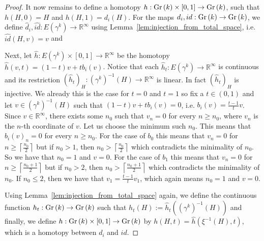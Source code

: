 \begin{proof}
It now remains to define a homotopy $h:\Gr{k}\times[0,1]\to\Gr{k}$, such that $h(H,0)=H$ and $h(H,1)=d_i(H)$. For the maps $d_i,id:\Gr{k}\to\Gr{k}$, we define $\hat{d}_i,\hat{id}:E(\gamma^k)\to \mathbb{R}^{\infty}$ using Lemma~\ref{lem:injection_from_total_space}, i.e. $\hat{id}(H,v)=v$ and
\begin{center}
\end{center}
Next, let $\hat{h}:E(\gamma^k)\times[0,1]\to\mathbb{R}^{\infty}$ be the homotopy $\hat{h}(v,t)=(1-t)v+tb_i(v)$. Notice that each $\hat{h}_t:E(\gamma^k)\to\mathbb{R}^{\infty}$ is continuous and its restriction $(\hat{h}_t)_H:(\gamma^k)^{-1}(H)\to\mathbb{R}^{\infty}$ is linear. In fact $(\hat{h}_t)_H$ is injective. We already this is the case for $t=0$ and $t=1$ so fix a $t\in(0,1)$ and let $v\in(\gamma^k)^{-1}(H)$ such that $(1-t)v+tb_i(v)=0$, i.e. $b_i(v)=\frac{t-1}{t}v$. Since $v\in\mathbb{R}^{\infty}$, there exists some $n_0$ such that $v_n=0$ for every $n\geq n_0$, where $v_n$ is the $n$-th coordinate of $v$. Let us choose the minimum such $n_0$. This means that $b_i(v)_n=0$ for every $n\geq n_0$. For the case of $b_0$ this means that $v_n=0$ for $n\geq\left\lceil\frac{n_0}{2}\right\rceil$ but if $n_0>1$, then $n_0>\left\lceil\frac{n_0}{2}\right\rceil$ which contradicts the minimality of $n_0$. So we have that $n_0=1$ and $v=0$. For the case of $b_1$ this means that $v_n=0$ for $n\geq\left\lceil\frac{n_0+1}{2}\right\rceil$ but if $n_0>2$, then $n_0>\left\lceil\frac{n_0+1}{2}\right\rceil$ which contradicts the minimality of $n_0$. If $n_0\leq2$, then we have that $v_1=\frac{t-1}{t}v_1$, which again means $n_0=1$ and $v=0$.

Using Lemma~\ref{lem:injection_from_total_space} again, we define the continuous function $h_t:\Gr{k}\to\Gr{k}$ such that $h_t(H):=\hat{h}_t((\gamma^k)^{-1}(H))$ and finally, we define $h:\Gr{k}\times[0,1]\to\Gr{k}$ by $h(H,t)=\hat{h}(\xi^{-1}(H),t)$, which is a homotopy between $d_i$ and $id$.
\end{proof}

